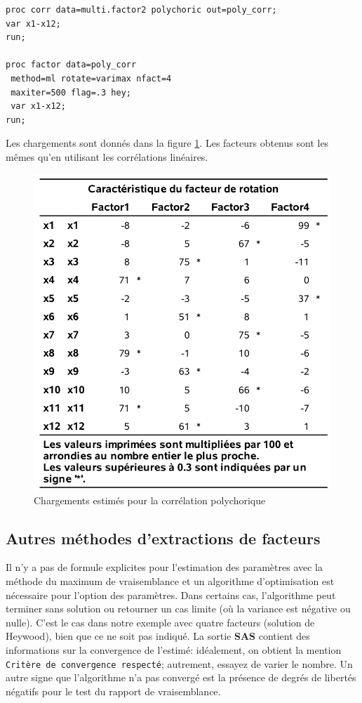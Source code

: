 \documentclass[
  11pt,
  letterpaper,
]{book}
\theoremstyle{definition}
\theoremstyle{definition}
\theoremstyle{definition}
\theoremstyle{remark}
\begin{document}
\begin{verbatim}
proc corr data=multi.factor2 polychoric out=poly_corr;
var x1-x12;
run;

proc factor data=poly_corr
 method=ml rotate=varimax nfact=4
 maxiter=500 flag=.3 hey;
 var x1-x12;
run;
\end{verbatim}

Les chargements sont donnés dans la figure \ref{fig:fig1p12}. Les facteurs obtenus sont les mêmes qu'en utilisant les corrélations linéaires.

\begin{figure}

{\centering \includegraphics[width=0.65\linewidth]{figures/01-facto-e12} 

}

\caption{Chargements estimés pour la corrélation polychorique}\label{fig:fig1p12}
\end{figure}

\hypertarget{autres-muxe9thodes-dextractions-de-facteurs}{%
\subsection{Autres méthodes d'extractions de facteurs}\label{autres-muxe9thodes-dextractions-de-facteurs}}

Il n'y a pas de formule explicites pour l'estimation des paramètres avec la méthode du maximum de vraisemblance et un algorithme d'optimisation est nécessaire pour l'option des paramètres. Dans certains cas, l'algorithme peut terminer sans solution ou retourner un cas limite (où la variance est négative ou nulle). C'est le cas dans notre exemple avec quatre facteurs (solution de Heywood), bien que ce ne soit pas indiqué. La sortie \textbf{SAS} contient des informations sur la convergence de l'estimé: idéalement, on obtient la mention \texttt{Critère\ de\ convergence\ respecté}; autrement, essayez de varier le nombre. Un autre signe que l'algorithme n'a pas convergé est la présence de degrés de libertés négatifs pour le test du rapport de vraisemblance.
\end{document}
